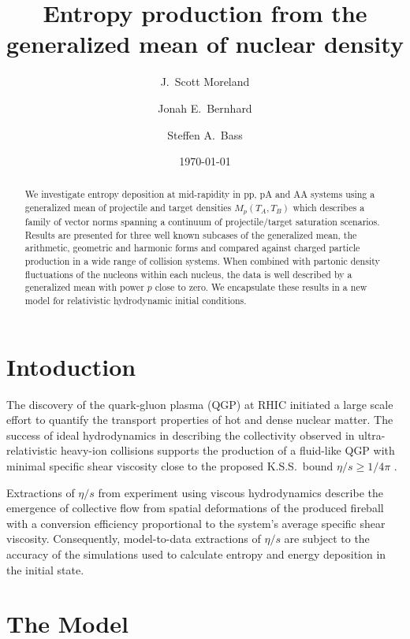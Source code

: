 \documentclass[aps,prl,reprint,amsmath,nofootinbib]{revtex4-1}
\begin{document}
\title{Entropy production from the generalized mean of nuclear density}

\author{J.\ Scott Moreland}
\author{Jonah E.\ Bernhard}
\author{Steffen A.\ Bass}

\date{\today}


\begin{abstract}
   We investigate entropy deposition at mid-rapidity in pp, pA and AA systems using a generalized mean of
   projectile and target densities $M_p(T_A,T_B)$ which describes a family of vector norms spanning a
   continuum of projectile/target saturation scenarios.  Results are presented for three well known subcases
   of the generalized mean, the arithmetic, geometric and harmonic forms and compared against charged particle
   production in a wide range of collision systems. When combined with partonic density fluctuations of the
   nucleons within each nucleus, the data is well described by a generalized mean with power $p$ close to
   zero. We encapsulate these results in a new model for relativistic hydrodynamic initial conditions.
\end{abstract}

\maketitle

\section{Intoduction}

The discovery of the quark-gluon plasma (QGP) at RHIC initiated a large scale effort to quantify the transport
properties of hot and dense nuclear matter. The success of ideal hydrodynamics in describing the collectivity
observed in ultra-relativistic heavy-ion collisions supports the production of a fluid-like QGP with minimal
specific shear viscosity close to the proposed K.S.S.\ bound $\eta/s \ge 1/4\pi$ \cite{KSS, Bjorken}.

Extractions of $\eta/s$ from experiment using viscous hydrodynamics describe the emergence of collective flow
from spatial deformations of the produced fireball with a conversion efficiency proportional to the system's
average specific shear viscosity.  Consequently, model-to-data extractions of $\eta/s$ are subject to the
accuracy of the simulations used to calculate entropy and energy deposition in the initial state.

\section{The Model}
\end{document}
